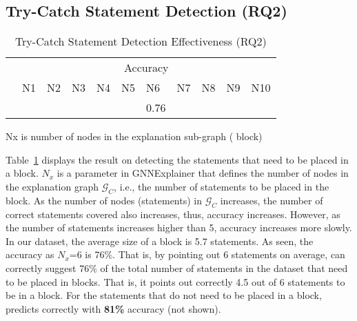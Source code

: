 \subsection{Try-Catch Statement Detection (RQ2)}
\label{sec:rq2}

\begin{table}[t]
  \caption{Try-Catch Statement Detection Effectiveness (RQ2)}
  \vspace{-12pt}
	\begin{center}
		\small
		\renewcommand{\arraystretch}{1} 
		\begin{tabular}{p{0.8cm}<{\centering}|p{0.4cm}<{\centering}|p{0.4cm}<{\centering}|p{0.4cm}<{\centering}|p{0.4cm}<{\centering}|p{0.4cm}<{\centering}|p{0.4cm}<{\centering}|p{0.4cm}<{\centering}|p{0.4cm}<{\centering}|p{0.4cm}<{\centering}|p{0.4cm}<{\centering}}
			\hline
			 	&  \multicolumn{10}{c}{Accuracy} \\
			\cline{2-11}
			     	&  N1  & N2   &  N3  & N4   &N5    & N6   &N7    & N8   &N9    & N10 \\
			\hline
			\tool       &  &  &  &  &  & 0.76 &  &  &  &   \\
			\hline
		\end{tabular}
		Nx is number of nodes in the explanation
                sub-graph ( block)
		\label{tab:rq2}
	\end{center}
\end{table}

Table~\ref{tab:rq2} displays the result on detecting the statements
that need to be placed in a  block. $N_x$ is a parameter
in GNNExplainer that defines the number of nodes in the explanation
graph $\mathcal{G}_C$, i.e., the number of statements to be placed in the
 block.
%
As the number of nodes (statements) in $\mathcal{G}_C$ increases, the
number of correct statements covered also increases, thus, accuracy
increases. However, as the number of statements increases higher than
5, accuracy increases more slowly. In our dataset, the average size of
a  block is 5.7 statements. As seen, the accuracy as
$N_x$=6 is 76\%. That is, by pointing out 6 statements on average,
{\tool} can correctly suggest 76\% of the total number of statements
in the dataset that need to be placed in 
blocks. That is, it points out correctly 4.5 out of 6 statements to be
in a  block. For the statements that do not need to be
placed in a  block, {\tool} predicts correctly with
{\bf 81\%} accuracy (not shown).

